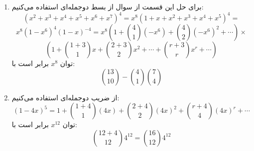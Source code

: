 \p
\begin{enumerate}
\item
برای حل این قسمت از سوال از بسط دوجمله‌ای استفاده می‌کنیم:
$$(x^2 + x^3 + x^4 + x^5 + x^6 + x^7)^4 = x^8(1 + x + x^2 + x^3 + x^4 + x^5)^4 =$$
$$ x^8(1 - x^6)^4(1 - x)^{-4} = x^8(1 + \binom 4 1 (-x^6) + \binom 4 2 (-x^6)^2 + \cdots)\times$$
$$(1 + \binom{1+3}{1}x + \binom{2 + 3}{2}x^2 + \cdots + \binom{r + 3}{r}x^r + \cdots)$$
توان
$x^8$
برابر است با:
$$\binom{13}{10} - \binom{4}{1}\binom{7}{4}$$
\item
از ضریب دوجمله‌ای استفاده می‌کنیم:
$$(1-4x)^5 = 1 + \binom{1+4}{1}(4x) + \binom{2+4}{2}(4x)^2 + \binom{r+4}{4}(4x)^r + \cdots$$
توان
$x^{12}$
برابر است با:
$$\binom{12+4}{12}4^{12} = \binom{16}{12}4^{12}$$
\end{enumerate}